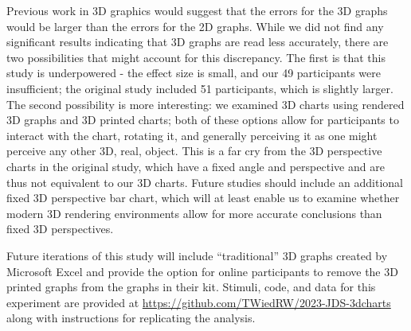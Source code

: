 \documentclass[letterpaper,inpress,dvipsnames]{jdsart}
\begin{document}
Previous work in 3D graphics would suggest that the errors for the 3D graphs would be larger than the errors for the 2D graphs. While we did not find any significant results indicating that 3D graphs are read less accurately, there are two possibilities that might account for this discrepancy. The first is that this study is underpowered - the effect size is small, and our 49 participants were insufficient; the original study included 51 participants, which is slightly larger. The second possibility is more interesting: we examined 3D charts using rendered 3D graphs and 3D printed charts; both of these options allow for participants to interact with the chart, rotating it, and generally perceiving it as one might perceive any other 3D, real, object. This is a far cry from the 3D perspective charts in the original study, which have a fixed angle and perspective and are thus not equivalent to our 3D charts. Future studies should include an additional fixed 3D perspective bar chart, which will at least enable us to examine whether modern 3D rendering environments allow for more accurate conclusions than fixed 3D perspectives.

Future iterations of this study will include ``traditional'' 3D graphs created by Microsoft Excel and provide the option for online participants to remove the 3D printed graphs from the graphs in their kit. Stimuli, code, and data for this experiment are provided at \url{https://github.com/TWiedRW/2023-JDS-3dcharts} along with instructions for replicating the analysis.



\end{document}
